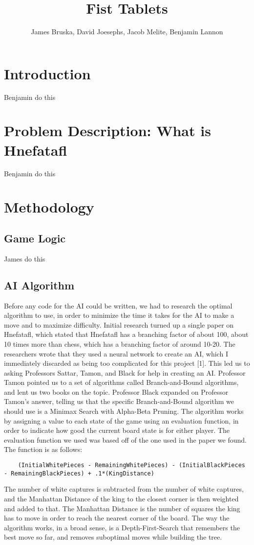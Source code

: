 \documentclass{article}
\title{Fist Tablets}
\author{James Bruska, David Joesephs, Jacob Melite, Benjamin Lannon}
\begin{document}
\maketitle
\tableofcontents

\section{Introduction}
Benjamin do this

\section{Problem Description: What is Hnefatafl}
Benjamin do this

\section{Methodology}

\subsection{Game Logic}
James do this

\subsection{AI Algorithm}
	Before any code for the AI could be written, we had to research the optimal algorithm to use, in order to minimize the time it takes for the AI to make a move and to maximize difficulty. Initial research turned up a single paper on Hnefatafl, which stated that Hnefatafl has a branching factor of about 100, about 10 times more than chess, which has a branching factor of around 10-20. The researchers wrote that they used a neural network to create an AI, which I immediately discarded as being too complicated for this project [1]. This led us to asking Professors Sattar, Tamon, and Black for help in creating an AI. Professor Tamon pointed us to a set of algorithms called Branch-and-Bound algorithms, and lent us two books on the topic. Professor Black expanded on Professor Tamon's answer, telling us that the specific Branch-and-Bound algorithm we should use is a Minimax Search with Alpha-Beta Pruning. The algorithm works by assigning a value to each state of the game using an evaluation function, in order to indicate how good the current board state is for either player. The evaluation function we used was based off of the one used in the paper we found. The function is as follows:
\begin{lstlisting}
	(InitialWhitePieces - RemainingWhitePieces) - (InitialBlackPieces - RemainingBlackPieces) + .1*(KingDistance)
\end{lstlisting}
The number of white captures is subtracted from the number of white captures, and the Manhattan Distance of the king to the closest corner is then weighted and added to that. The Manhattan Distance is the number of squares the king has to move in order to reach the nearest corner of the board.
	The way the algorithm works, in a broad sense, is a Depth-First-Search that remembers the best move so far, and removes suboptimal moves while building the tree. 
\end{document}
